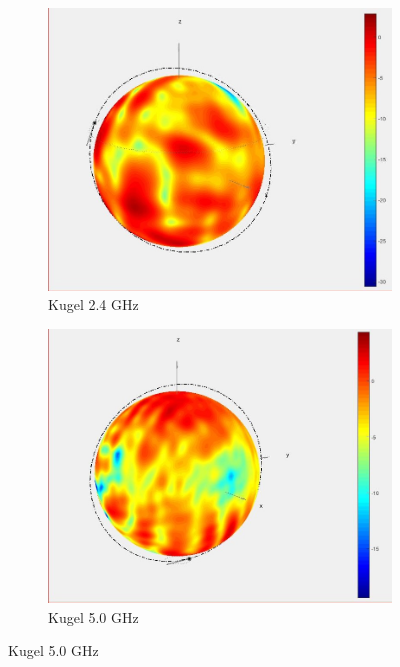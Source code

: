 \begin{figure}[h!]
	\begin{subfigure}[t]{0.49\textwidth}
		\includegraphics[width=1\textwidth]{../fig/plt/2_4GHz_justsphere.jpg}
		\caption{Kugel 2.4 GHz}
	\end{subfigure}
	\begin{subfigure}[t]{0.49\textwidth}
		\includegraphics[width=1\textwidth]{../fig/plt/5GHz_just_sphere.jpg}
		\caption{Kugel 5.0 GHz}
	\end{subfigure}
	

\end{figure}
